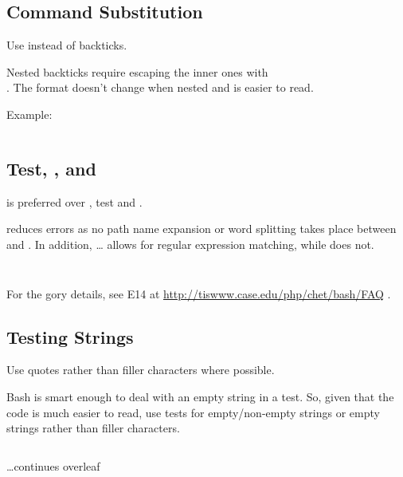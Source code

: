 \documentclass{article}
\begin{document}
\subsection{Command Substitution}
\label{subsec:cmd_sub}
Use  instead of backticks.

Nested backticks require escaping the inner ones with \\ . The  format doesn’t change when nested and is easier to read.

Example:
\inputminted[frame=single,firstline=214, lastline=218,linenos]{bash}{./styleguide.bash}

\subsection{Test, \code{[[ … ]}, and \code{[[ … ]]}}
\label{subsec:test}
\code{[[ … ]]} is preferred over \code{[ … ]}, test and \code{/usr/bin/[}.

\code{[[ … ]]} reduces errors as no path name expansion or word splitting takes place between \code{[[} and \code{]]}. In addition, \code{[[} … \code{]]} allows for regular expression matching, while \code{[ … ]} does not.

\inputminted[frame=single,firstline=220, lastline=230,linenos]{bash}{./styleguide.bash}

\inputminted[frame=single,firstline=232, lastline=236,linenos]{bash}{./styleguide.bash}

For the gory details, see E14 at \url{http://tiswww.case.edu/php/chet/bash/FAQ} .

\subsection{Testing Strings}
\label{subsec:test_str}
Use quotes rather than filler characters where possible.

Bash is smart enough to deal with an empty string in a test. So, given that the code is much easier to read, use tests for empty/non-empty strings or empty strings rather than filler characters.

\inputminted[frame=single,firstline=238, lastline=252,linenos]{bash}{./styleguide.bash}

\begin{center}
\vspace{1em}
\ldots continues overleaf    
\end{center}

\inputminted[frame=single,firstline=254, lastline=257,linenos]{bash}{./styleguide.bash}
\end{document}
